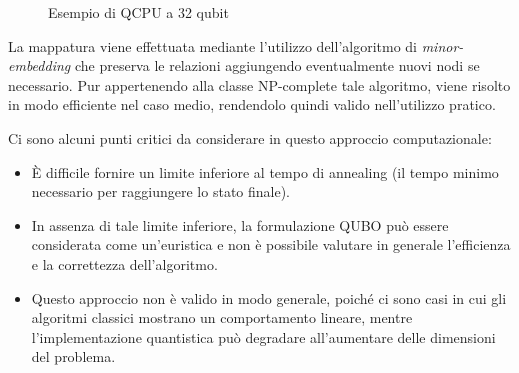 \documentclass{article}
\begin{document}
\begin{figure}
\begin{center}
    \caption{Esempio di QCPU a 32 qubit}
\end{center}
\end{figure}

La mappatura viene effettuata mediante l'utilizzo dell'algoritmo di \emph{minor-embedding} che preserva le relazioni aggiungendo eventualmente nuovi nodi se necessario. Pur appertenendo alla classe NP-complete tale algoritmo, viene risolto in modo efficiente nel caso medio, rendendolo quindi valido nell'utilizzo pratico.

Ci sono alcuni punti critici da considerare in questo approccio computazionale:

\begin{itemize}
    \item È difficile fornire un limite inferiore al tempo di annealing (il tempo minimo necessario per raggiungere lo stato finale).
    \item In assenza di tale limite inferiore, la formulazione QUBO può essere considerata come un'euristica e non è possibile valutare in generale l'efficienza e la correttezza dell'algoritmo.
    \item Questo approccio non è valido in modo generale, poiché ci sono casi in cui gli algoritmi classici mostrano un comportamento lineare, mentre l'implementazione quantistica può degradare all'aumentare delle dimensioni del problema.
\end{itemize}
\end{document}
